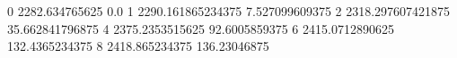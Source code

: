 0 2282.634765625 0.0
1 2290.161865234375 7.527099609375
2 2318.297607421875 35.662841796875
4 2375.2353515625 92.6005859375
6 2415.0712890625 132.4365234375
8 2418.865234375 136.23046875
